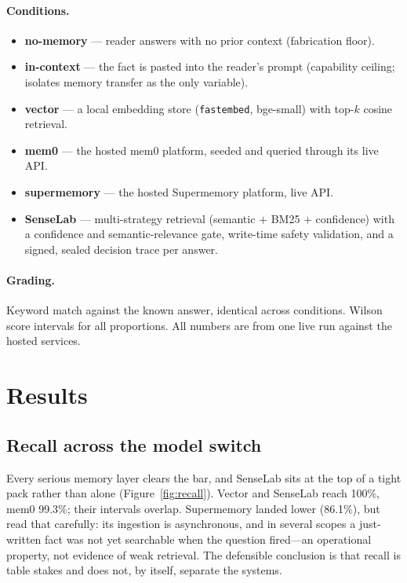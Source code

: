 \documentclass[11pt]{article}
\begin{document}
\paragraph{Conditions.}
\begin{itemize}[topsep=2pt,itemsep=1pt]
\item \textbf{no-memory} --- reader answers with no prior context (fabrication floor).
\item \textbf{in-context} --- the fact is pasted into the reader's prompt (capability
  ceiling; isolates memory transfer as the only variable).
\item \textbf{vector} --- a local embedding store (\texttt{fastembed}, bge-small) with
  top-$k$ cosine retrieval.
\item \textbf{mem0} --- the hosted mem0 platform, seeded and queried through its live API.
\item \textbf{supermemory} --- the hosted Supermemory platform, live API.
\item \textbf{SenseLab} --- multi-strategy retrieval (semantic $+$ BM25 $+$
  confidence) with a confidence and semantic-relevance gate, write-time safety validation,
  and a signed, sealed decision trace per answer.
\end{itemize}

\paragraph{Grading.} Keyword match against the known answer, identical across conditions.
Wilson score intervals for all proportions. All numbers are from one live run against the
hosted services.

\section{Results}\label{sec:results}

\subsection{Recall across the model switch}

Every serious memory layer clears the bar, and SenseLab sits at the top of a tight pack rather
than alone (Figure~\ref{fig:recall}). Vector and SenseLab reach 100\%, mem0 99.3\%; their
intervals overlap. Supermemory landed lower (86.1\%), but read that carefully: its ingestion
is asynchronous, and in several scopes a just-written fact was not yet searchable when the
question fired---an operational property, not evidence of weak retrieval. The defensible
conclusion is that recall is table stakes and does not, by itself, separate the systems.
\end{document}
